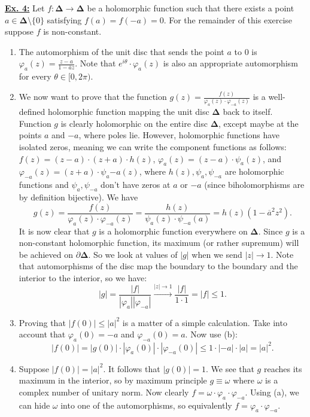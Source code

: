 \documentclass[a4paper, 12pt]{article} %
\newcommand{\C}{\mathbb{C}}
\begin{document}
\underline{\textbf{Ex. 4:}}
Let $f\colon\mathbf{\Delta}\to\mathbf{\Delta}$ be a holomorphic function such that there exists a point $a \in \mathbf{\Delta}\setminus\lbrace 0 \rbrace$ satisfying $f(a) = f(-a) = 0$. For the remainder of this exercise suppose $f$ is non-constant.
\begin{enumerate}[label=(\alph*)]
\item The automorphism of the unit disc that sends the point $a$ to $0$ is $\varphi_a(z) = \frac{z-a}{1 - \overline{a}z}$. Note that $e^{i\theta}\cdot \varphi_a(z)$ is also an appropriate automorphism for every $\theta \in [0, 2\pi)$.
\item We now want to prove that the function $g(z) = \frac{f(z)}{\varphi_a(z)\cdot\varphi_{-a}(z)}$ is a well-defined holomorphic function mapping the unit disc $\mathbf{\Delta}$ back to itself.
Function $g$ is clearly holomorphic on the entire disc $\mathbf{\Delta}$, except maybe at the points $a$ and $-a$, where poles lie. However, holomorphic functions have isolated zeros, meaning we can write the component functions as follows: $f(z) = (z-a)\cdot(z+a)\cdot h(z)$, $\varphi_a(z) = (z-a)\cdot \psi_a(z)$, and $\varphi_{-a}(z) = (z+a)\cdot \psi_a{-a}(z)$, where $h(z), \psi_a, \psi_{-a}$ are holomorphic functions and $\psi_a, \psi_{-a}$ don't have zeros at $a$ or $-a$ (since biholomorphisms are by definition bijective). We have
\[
g(z) = \frac{f(z)}{\varphi_a(z)\cdot\varphi_{-a}(z)} = \frac{h(z)}{\psi_a(z)\cdot\psi_{-a}(a)} = h(z)(1 - \overline{a}^2z^2).
\]
It is now clear that $g$ is a holomorphic function everywhere on $\mathbf{\Delta}$.
Since $g$ is a non-constant holomorphic function, its maximum (or rather supremum) will be achieved on $\partial\mathbf{\Delta}$. So we look at values of $|g|$ when we send $|z| \to 1$. Note that automorphisms of the disc map the boundary to the boundary and the interior to the interior, so we have:
\[
|g| = \frac{|f|}{|\varphi_a||\varphi_{-a}|} \xrightarrow{|z| \to 1} \frac{|f|}{1\cdot 1} = |f| \leq 1.
\]

\item Proving that $|f(0)| \leq |a|^2$ is a matter of a simple calculation. Take into account that $\varphi_a(0) = -a$ and $\varphi_{-a}(0) = a$. Now use (b):
\[
|f(0)| = |g(0)|\cdot|\varphi_a(0)|\cdot|\varphi_{-a}(0)| \leq 1 \cdot |-a| \cdot |a| = |a|^2.
\]
\item Suppose $|f(0)| = |a|^2$. It follows that $|g(0)| = 1$. We see that $g$ reaches its maximum in the interior, so by maximum principle $g \equiv \omega$ where $\omega$ is a complex number of unitary norm. Now clearly $f = \omega\cdot\varphi_a\cdot\varphi_{-a}$. Using (a), we can hide $\omega$ into one of the automorphisms, so equivalently $f = \varphi_a\cdot\varphi_{-a}$.
\end{enumerate}
\end{document}
